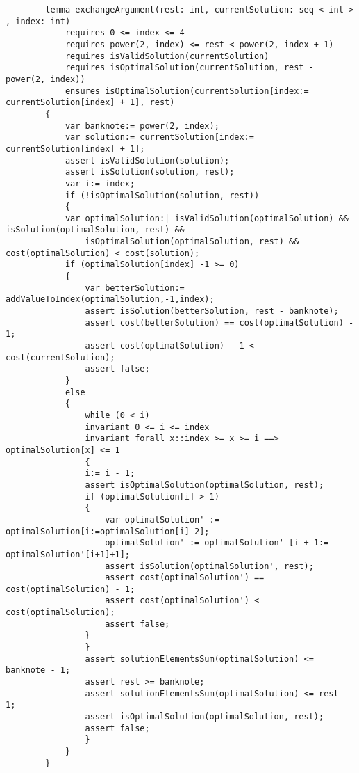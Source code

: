     
    \begin{lstlisting}
        lemma exchangeArgument(rest: int, currentSolution: seq < int > , index: int)
            requires 0 <= index <= 4
            requires power(2, index) <= rest < power(2, index + 1)
            requires isValidSolution(currentSolution)
            requires isOptimalSolution(currentSolution, rest - power(2, index))
            ensures isOptimalSolution(currentSolution[index:= currentSolution[index] + 1], rest) 
        {
            var banknote:= power(2, index);
            var solution:= currentSolution[index:= currentSolution[index] + 1];
            assert isValidSolution(solution);
            assert isSolution(solution, rest);
            var i:= index;
            if (!isOptimalSolution(solution, rest)) 
            {
            var optimalSolution:| isValidSolution(optimalSolution) && isSolution(optimalSolution, rest) &&
                isOptimalSolution(optimalSolution, rest) && cost(optimalSolution) < cost(solution);
            if (optimalSolution[index] -1 >= 0) 
            {
                var betterSolution:= addValueToIndex(optimalSolution,-1,index);
                assert isSolution(betterSolution, rest - banknote);
                assert cost(betterSolution) == cost(optimalSolution) - 1;
                assert cost(optimalSolution) - 1 < cost(currentSolution);
                assert false;
            } 
            else 
            {
                while (0 < i)
                invariant 0 <= i <= index
                invariant forall x::index >= x >= i ==> optimalSolution[x] <= 1 
                {
                i:= i - 1;
                assert isOptimalSolution(optimalSolution, rest);
                if (optimalSolution[i] > 1) 
                {
                    var optimalSolution' := optimalSolution[i:=optimalSolution[i]-2];
                    optimalSolution' := optimalSolution' [i + 1:= optimalSolution'[i+1]+1];
                    assert isSolution(optimalSolution', rest);
                    assert cost(optimalSolution') == cost(optimalSolution) - 1;
                    assert cost(optimalSolution') < cost(optimalSolution);
                    assert false;
                }
                }
                assert solutionElementsSum(optimalSolution) <= banknote - 1;
                assert rest >= banknote; 
                assert solutionElementsSum(optimalSolution) <= rest - 1; 
                assert isOptimalSolution(optimalSolution, rest); 
                assert false;
                }
            }
        }
    \end{lstlisting}
    
